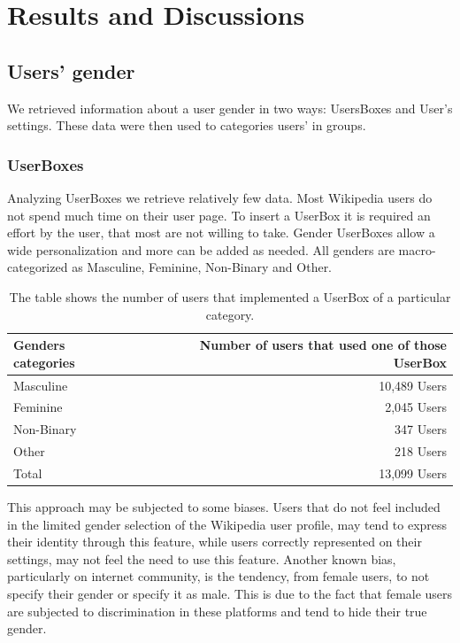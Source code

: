 \chapter{Results and Discussions}
\label{cha:results}

\section{Users' gender}
\label{sec:resusergender}
We retrieved information about a user gender in two ways: UsersBoxes and User’s settings. These data were then used to categories users’ in groups.

\subsection{UserBoxes}
\label{sec:resuserboxes}
Analyzing UserBoxes we retrieve relatively few data. Most Wikipedia users do not spend much time on their user page. To insert a UserBox it is required an effort by the user, that most are not willing to take. Gender UserBoxes allow a wide personalization and more can be added as needed. All genders are macro-categorized as Masculine, Feminine, Non-Binary and Other. 

\begin{table}[H]
    \centering
    \begin{tabularx}{\columnwidth}{@{}Xr@{}}
        \midrule
        \textbf{Genders categories} & \textbf{Number of users that used one of those UserBox} \\ \toprule
        Masculine & 10,489 Users  \\
        Feminine &  2,045 Users \\
        Non-Binary &  347 Users \\
        Other &  218 Users \\
        \bottomrule
        Total &  13,099 Users \\

         \bottomrule
    \end{tabularx}
    
    \caption{The table shows the number of users that implemented a UserBox of a particular category. \label{table:datasetsize}}
\end{table}

This approach may be subjected to some biases. Users that do not feel included in the limited gender selection of the Wikipedia user profile, may tend to express their identity through this feature, while users correctly represented on their settings, may not feel the need to use this feature. Another known bias, particularly on internet community, is the tendency, from female users, to not specify their gender or specify it as male. This is due to the fact that female users are subjected to discrimination in these platforms and tend to hide their true gender.

